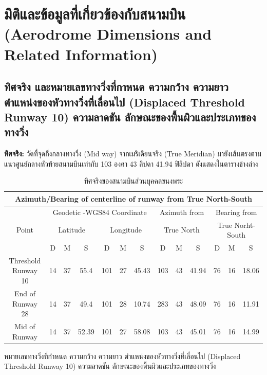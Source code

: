 \section{มิติและข้อมูลที่เกี่ยวข้องกับสนามบิน (Aerodrome Dimensions and Related Information)}

\subsection{ทิศจริง และหมายเลขทางวิ่งที่กาหนด ความกว้าง ความยาว ตำแหน่งของหัวทางวิ่งที่เลื่อนไป (Displaced Threshold Runway 10) ความลาดชัน ลักษณะของพื้นผิวและประเภทของทางวิ่ง}

\textbf{ทิศจริง:} วัดที่จุดกึ่งกลางทางวิ่ง (Mid way) จากเมริเดียนจริง (True Meridian) มายังเส้นตรงตามแนวศูนย์กลางหัวท้ายสนามบินเท่ากับ 103 องศา 43 ลิปดา 41.94  ฟิลิปดา  ดังแสดงในตารางข้างล่าง

\begin{table}[h!]
\caption{ทิศจริงของสนามบินส่วนบุคคลขนงพระ}
\begin{center}
\begin{tabular}{|c|c|c|c|c|c|c|c|c|c|c|c|c|}
\hline
\multicolumn{13}{|c|}{\textbf{Azimuth/Bearing of centerline of runway from True North-South}} \\ \hline
\multirow{3}{*}{Point} & \multicolumn{6}{c|}{Geodetic -WGS84 Coordinate} & \multicolumn{3}{c}{Azimuth from} & \multicolumn{3}{c|}{Bearing from} \\ \cline{2-13}
 & \multicolumn{3}{c|}{Latitude} & \multicolumn{3}{c|}{Longitude} & \multicolumn{3}{c|}{True North} & \multicolumn{3}{c|}{True Norht-South} \\ \cline{2-13}
  & D & M & S & D & M & S & D & M & S & D & M & S \\
  \hline
  Threshold Runway 10 & 14 & 37 & 55.4 & 101 & 27 & 45.43 & 103 & 43 & 41.94 & 76 & 16 & 18.06 \\
  End of Runway 28 & 14 & 37 & 49.4 & 101 & 28 & 10.74 & 283 & 43 & 48.09 & 76 & 16 & 11.91 \\
  Mid of Runway & 14 & 37 & 52.39 & 101 & 27 & 58.08 & 103 & 43 & 45.01 & 76 & 16 & 14.99 \\
 \hline

\end{tabular}
\end{center}
\label{default}
\end{table}%

หมายเลขทางวิ่งที่กำหนด ความกว้าง ความยาว ตำแหน่งของหัวทางวิ่งที่เลื่อนไป (Displaced Threshold Runway 10) ความลาดชัน ลักษณะของพื้นผิวและประเภทของทางวิ่ง 

